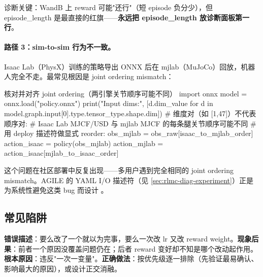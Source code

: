 诊断关键：WandB 上 reward 可能"还行"（短 episode 负分少），但 episode\_length 是最直接的红旗——\textbf{永远把 episode\_length 放诊断面板第一行}。

\paragraph{路径 3：sim-to-sim 行为不一致。}Isaac Lab（PhysX）训练的策略导出 ONNX 后在 mjlab（MuJoCo）回放，机器人完全不走。最常见根因是 joint ordering mismatch：

\begin{codebox}[Python]{核对并对齐 joint ordering（两引擎关节顺序可能不同）}
import onnx
model = onnx.load("policy.onnx")
print("Input dims:",
      [d.dim_value for d in model.graph.input[0].type.tensor_type.shape.dim])
# 维度对（如 [1,47]）不代表顺序对:
# Isaac Lab MJCF/USD 与 mjlab MJCF 的每条腿关节顺序可能不同
# 用 deploy 描述符做显式 reorder:
obs_mjlab     = obs_raw[isaac_to_mjlab_order]
action_isaac  = policy(obs_mjlab)
action_mjlab  = action_isaac[mjlab_to_isaac_order]
\end{codebox}

这个问题在社区部署中反复出现——多用户遇到完全相同的 joint ordering mismatch。AGILE 的 YAML I/O 描述符（见 \cref{sec:rlmc-diag-experiment}）正是为系统性避免这类 bug 而设计 \cite{nvidia2026agile}。

\subsection{常见陷阱}

\begin{pitfall}
\textbf{错误描述}：要么改了一个就以为完事，要么一次改 lr 又改 reward weight。\textbf{现象后果}：前者一个原因没覆盖问题仍在；后者 reward 变好却不知是哪个改动起作用。\textbf{根本原因}：违反"一次一变量"。\textbf{正确做法}：按优先级逐一排除（先验证最易确认、影响最大的原因），或设计正交消融。
\end{pitfall}

\begin{practice}[本节动手任务]
\end{practice}

